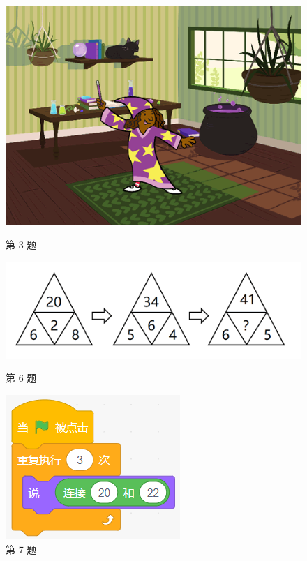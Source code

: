 \documentclass[10pt, a4paper]{article}
\begin{document}
\begin{enumerate}
\begin{figure}[htbp]
\begin{minipage}[t]{.16\textwidth}
                \includegraphics[width=\textwidth]{figure/3.png}
                \caption*{第 3 题}
            \end{minipage}
            \begin{minipage}[t]{.31\textwidth}
                \centering
                \includegraphics[width=\textwidth]{figure/6.png}
                \caption*{第 6 题}
            \end{minipage}
            \begin{minipage}[t]{.15\textwidth}
                \centering
                \includegraphics[width=\textwidth]{figure/7.png}
                \caption*{第 7 题}
            \end{minipage}
        \end{figure}


\end{enumerate}
\end{document}

